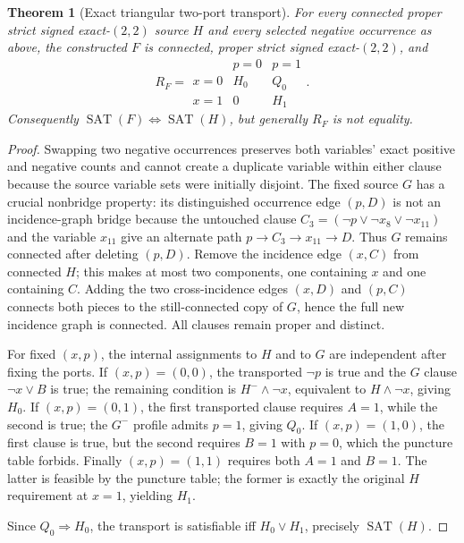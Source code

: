 \documentclass[11pt]{article}
\newtheorem{theorem}{Theorem}
\begin{document}
\begin{theorem}[Exact triangular two-port transport]
For every connected proper strict signed exact-$(2,2)$ source $H$ and every selected negative occurrence as above, the constructed $F$ is connected, proper strict signed exact-$(2,2)$, and
\[
\boxed{\quad R_F=\begin{array}{c|cc} & p=0 & p=1\\\hline x=0&H_0&Q_0\\ x=1&0&H_1\end{array}.\quad}
\]
Consequently \(\operatorname{SAT}(F)\iff\operatorname{SAT}(H)\), but generally $R_F$ is not equality.
\end{theorem}
\begin{proof}
Swapping two negative occurrences preserves both variables' exact positive and negative counts and cannot create a duplicate variable within either clause because the source variable sets were initially disjoint. The fixed source $G$ has a crucial nonbridge property: its distinguished occurrence edge $(p,D)$ is not an incidence-graph bridge because the untouched clause $C_3=(\neg p\lor\neg x_8\lor\neg x_{11})$ and the variable $x_{11}$ give an alternate path $p\to C_3\to x_{11}\to D$. Thus $G$ remains connected after deleting $(p,D)$. Remove the incidence edge $(x,C)$ from connected $H$; this makes at most two components, one containing $x$ and one containing $C$. Adding the two cross-incidence edges $(x,D)$ and $(p,C)$ connects both pieces to the still-connected copy of $G$, hence the full new incidence graph is connected. All clauses remain proper and distinct.

For fixed $(x,p)$, the internal assignments to $H$ and to $G$ are independent after fixing the ports. If $(x,p)=(0,0)$, the transported $\neg p$ is true and the $G$ clause $\neg x\lor B$ is true; the remaining condition is $H^{-}\wedge\neg x$, equivalent to $H\wedge\neg x$, giving $H_0$. If $(x,p)=(0,1)$, the first transported clause requires $A=1$, while the second is true; the $G^{-}$ profile admits $p=1$, giving $Q_0$. If $(x,p)=(1,0)$, the first clause is true, but the second requires $B=1$ with $p=0$, which the puncture table forbids. Finally $(x,p)=(1,1)$ requires both $A=1$ and $B=1$. The latter is feasible by the puncture table; the former is exactly the original $H$ requirement at $x=1$, yielding $H_1$.

Since $Q_0\Rightarrow H_0$, the transport is satisfiable iff $H_0\lor H_1$, precisely $\operatorname{SAT}(H)$. \end{proof}
\end{document}
